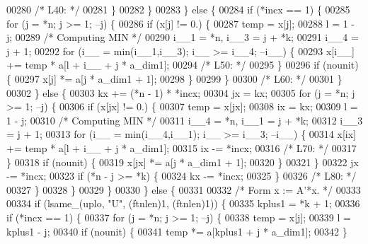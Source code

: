 \begin{DoxyCode}
00280 \textcolor{comment}{/* L40: */}
00281         \}
00282         \}
00283     \} \textcolor{keywordflow}{else} \{
00284         \textcolor{keywordflow}{if} (*incx == 1) \{
00285         \textcolor{keywordflow}{for} (j = *n; j >= 1; --j) \{
00286             \textcolor{keywordflow}{if} (x[j] != 0.) \{
00287             temp = x[j];
00288             l = 1 - j;
00289 \textcolor{comment}{/* Computing MIN */}
00290             i\_\_1 = *n, i\_\_3 = j + *k;
00291             i\_\_4 = j + 1;
00292             \textcolor{keywordflow}{for} (i\_\_ = min(i\_\_1,i\_\_3); i\_\_ >= i\_\_4; --i\_\_) \{
00293                 x[i\_\_] += temp * a[l + i\_\_ + j * a\_dim1];
00294 \textcolor{comment}{/* L50: */}
00295             \}
00296             \textcolor{keywordflow}{if} (nounit) \{
00297                 x[j] *= a[j * a\_dim1 + 1];
00298             \}
00299             \}
00300 \textcolor{comment}{/* L60: */}
00301         \}
00302         \} \textcolor{keywordflow}{else} \{
00303         kx += (*n - 1) * *incx;
00304         jx = kx;
00305         \textcolor{keywordflow}{for} (j = *n; j >= 1; --j) \{
00306             \textcolor{keywordflow}{if} (x[jx] != 0.) \{
00307             temp = x[jx];
00308             ix = kx;
00309             l = 1 - j;
00310 \textcolor{comment}{/* Computing MIN */}
00311             i\_\_4 = *n, i\_\_1 = j + *k;
00312             i\_\_3 = j + 1;
00313             \textcolor{keywordflow}{for} (i\_\_ = min(i\_\_4,i\_\_1); i\_\_ >= i\_\_3; --i\_\_) \{
00314                 x[ix] += temp * a[l + i\_\_ + j * a\_dim1];
00315                 ix -= *incx;
00316 \textcolor{comment}{/* L70: */}
00317             \}
00318             \textcolor{keywordflow}{if} (nounit) \{
00319                 x[jx] *= a[j * a\_dim1 + 1];
00320             \}
00321             \}
00322             jx -= *incx;
00323             \textcolor{keywordflow}{if} (*n - j >= *k) \{
00324             kx -= *incx;
00325             \}
00326 \textcolor{comment}{/* L80: */}
00327         \}
00328         \}
00329     \}
00330     \} \textcolor{keywordflow}{else} \{
00331 
00332 \textcolor{comment}{/*        Form  x := A'*x. */}
00333 
00334     \textcolor{keywordflow}{if} (lsame\_(uplo, \textcolor{stringliteral}{"U"}, (ftnlen)1, (ftnlen)1)) \{
00335         kplus1 = *k + 1;
00336         \textcolor{keywordflow}{if} (*incx == 1) \{
00337         \textcolor{keywordflow}{for} (j = *n; j >= 1; --j) \{
00338             temp = x[j];
00339             l = kplus1 - j;
00340             \textcolor{keywordflow}{if} (nounit) \{
00341             temp *= a[kplus1 + j * a\_dim1];
00342             \}

\end{DoxyCode}
